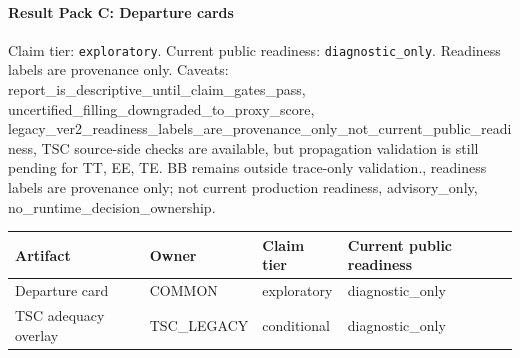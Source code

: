 \paragraph{Result Pack C: Departure cards}
Claim tier: \texttt{exploratory}. Current public readiness:
\texttt{diagnostic\_only}. Readiness labels are
provenance only. Caveats: report\_is\_descriptive\_until\_claim\_gates\_pass, uncertified\_filling\_downgraded\_to\_proxy\_score, legacy\_ver2\_readiness\_labels\_are\_provenance\_only\_not\_current\_public\_readiness, TSC source-side checks are available, but propagation validation is still pending for TT, EE, TE. BB remains outside trace-only validation., readiness labels are provenance only; not current production readiness, advisory\_only, no\_runtime\_decision\_ownership.

\begin{center}
\begin{tabular}{llll}
\hline
Artifact & Owner & Claim tier & Current public readiness \\
\hline
Departure card & COMMON & exploratory & diagnostic\_only \\
TSC adequacy overlay & TSC\_LEGACY & conditional & diagnostic\_only \\
\hline
\end{tabular}
\end{center}
